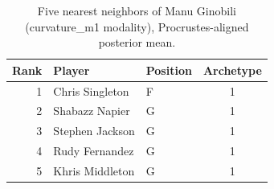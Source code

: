 \begin{table}[htbp]
  \centering\small
  \begin{tabular}{rllc}
    \toprule
    Rank & Player & Position & Archetype \\
    \midrule
    1 & Chris Singleton & F & 1 \\
    2 & Shabazz Napier & G & 1 \\
    3 & Stephen Jackson & G & 1 \\
    4 & Rudy Fernandez & G & 1 \\
    5 & Khris Middleton & G & 1 \\
    \bottomrule
  \end{tabular}
  \caption{Five nearest neighbors of Manu Ginobili (curvature_m1 modality), Procrustes-aligned posterior mean.}
  \label{tab:Manu_Ginobili_neighbors_curvature_m1}
\end{table}

